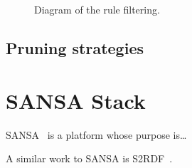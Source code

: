 \documentclass{article}
\begin{document}
\begin{figure}[H]
\centering
\resizebox{!}{0.50\textheight}{%
    
}
\caption{Diagram of the rule filtering.}
\label{fig:accepted_for_output}
\end{figure}

\subsection{Pruning strategies}

\section{SANSA Stack}

SANSA~\cite{lehmann-2017-sansa-iswc} is a platform whose purpose is\ldots

A similar work to SANSA is S2RDF~\cite{schatzle2016s2rdf}.



\end{document}
